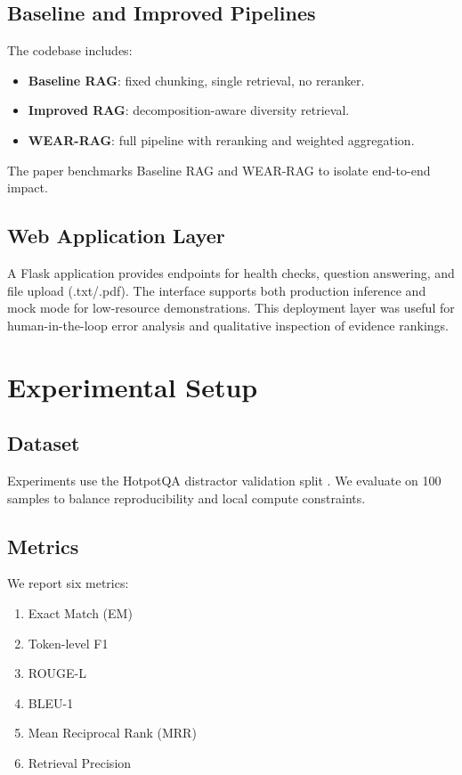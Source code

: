 \documentclass[10pt,draftclsnofoot,onecolumn,journal]{IEEEtran}
\begin{document}
\subsection{Baseline and Improved Pipelines}
The codebase includes:
\begin{itemize}
\item \textbf{Baseline RAG}: fixed chunking, single retrieval, no reranker.
\item \textbf{Improved RAG}: decomposition-aware diversity retrieval.
\item \textbf{WEAR-RAG}: full pipeline with reranking and weighted aggregation.
\end{itemize}

The paper benchmarks Baseline RAG and WEAR-RAG to isolate end-to-end impact.

\subsection{Web Application Layer}
A Flask application provides endpoints for health checks, question answering, and file upload (.txt/.pdf). The interface supports both production inference and mock mode for low-resource demonstrations. This deployment layer was useful for human-in-the-loop error analysis and qualitative inspection of evidence rankings.

\section{Experimental Setup}
\subsection{Dataset}
Experiments use the HotpotQA distractor validation split \cite{yang2018hotpotqa}. We evaluate on 100 samples to balance reproducibility and local compute constraints.

\subsection{Metrics}
We report six metrics:
\begin{enumerate}
\item Exact Match (EM)
\item Token-level F1
\item ROUGE-L
\item BLEU-1
\item Mean Reciprocal Rank (MRR)
\item Retrieval Precision
\end{enumerate}
\end{document}
